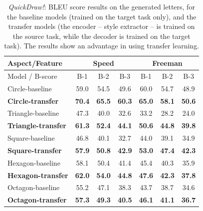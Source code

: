         \begin{table}[!htbp]
          \centering
          \begin{tabular}{l c c c|c c c}
            \hline
            \multicolumn{1}{l}{Aspect/Feature} & \multicolumn{3}{c}{ Speed } & \multicolumn{3}{c}{ Freeman }   \\ \hline
            Model / B-score      & B-1  & B-2  & B-3           & B-1  & B-2   & B-3              \\ \hline
            Circle-baseline &    59.0 & 54.5 & 49.6 & 60.0 & 54.7 & 48.9 \\%
            \textbf{Circle-transfer} &    \textbf{70.4} & \textbf{65.5} & \textbf{60.3} & \textbf{65.0} & \textbf{58.1} & \textbf{50.6} \\\hline

            Triangle-baseline &  47.3 & 40.0 & 32.6 & 33.2 & 28.2 & 24.0  \\%
            \textbf{Triangle-transfer} &  \textbf{61.3} & \textbf{52.4} & \textbf{44.1} & \textbf{50.6} & \textbf{44.8} & \textbf{39.8}  \\\hline

            Square-baseline &    46.8 & 40.1 & 32.7 & 44.0 & 39.1 & 34.9  \\%
            \textbf{Square-transfer} &    \textbf{57.9} & \textbf{50.8} & \textbf{42.9} & \textbf{53.0} & \textbf{47.4} & \textbf{42.3} \\\hline

            Hexagon-baseline &   58.1 & 50.4 & 41.4 & 45.4 & 40.3 & 35.9   \\%
            \textbf{Hexagon-transfer} &   \textbf{62.0} & \textbf{54.0} & \textbf{44.8} & \textbf{47.6} & \textbf{42.3} & \textbf{37.8}  \\\hline

            Octagon-baseline &   55.2 & 47.1 & 38.3 & 43.7 & 38.7 & 34.6   \\%
            \textbf{Octagon-transfer} &   \textbf{57.3} & \textbf{49.3} & \textbf{40.5} & \textbf{46.1} & \textbf{41.1} & \textbf{36.7}  \\\hline

          \end{tabular}
          \caption{\textit{QuickDraw!}: BLEU score results on the generated letters, for the baseline models (trained on the target task only), and the transfer models (the encoder -- style extractor -- is trained on the source task, while the decoder is trained on the target task). The results show an advantage in using transfer learning.}
          \label{table:bleu_score_quickdraw_transfer}
        \end{table}

